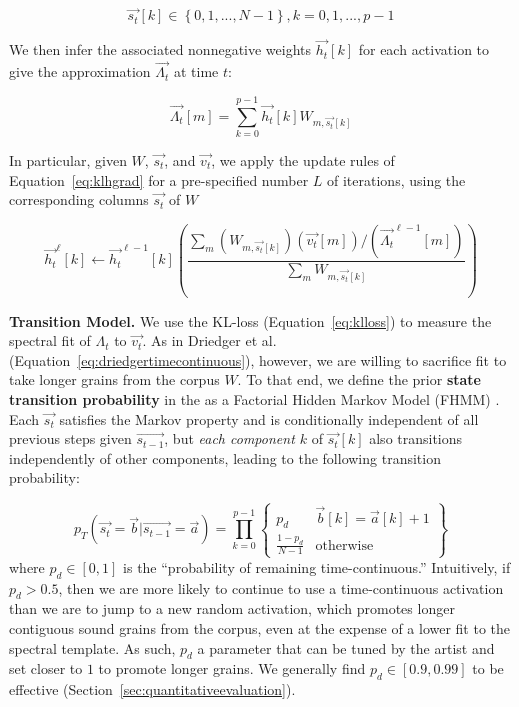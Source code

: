 \documentclass{article}
\begin{document}
    \begin{equation} 
        \label{eq:statevector}
        \vec{s_t}[k] \in \left\{0, 1, ..., N-1\right\}, k = 0, 1, ..., p-1 
    \end{equation}

    We then infer the associated nonnegative weights $\vec{h_t}[k]$ for each activation to give the approximation $\vec{\Lambda_t}$ at time $t$:
    
    \begin{equation}
        \label{eq:approximation}
        \vec{\Lambda_t}[m] = \sum_{k=0}^{p-1} \vec{h_t}[k]  W_{m, \vec{s_t}[k]}
    \end{equation}

    In particular, given $W$, $\vec{s_t}$, and $\vec{v_t}$, we apply the update rules of Equation~\ref{eq:klhgrad} for a pre-specified number $L$ of iterations, using the corresponding columns $\vec{s_t}$ of $W$

    \begin{equation}
        \label{eq:sparseklhgrad}
        \vec{h_t}^{\ell}[k]  \gets \vec{h_t}^{\ell-1}[k] \left(  \frac{\sum_m (W_{m, \vec{s_t}[k]}) (\vec{v_t}[m]) / (\vec{\Lambda_t}^{\ell-1}[m]) }{ \sum_{m} W_{m, \vec{s_t}[k]}} \right)
    \end{equation}
    

    \textbf{Transition Model.} We use the KL-loss (Equation~\ref{eq:klloss}) to measure the spectral fit of $\Lambda_t$ to $\vec{v_t}$.  As in Driedger et al. \cite{driedger2015let} (Equation~\ref{eq:driedgertimecontinuous}), however, we are willing to sacrifice fit to take longer grains from the corpus $W$.  To that end, we define the prior  \textbf{state transition probability} in the as a Factorial Hidden Markov Model (FHMM) \cite{ghahramani1995factorial}. Each $\vec{s_t}$ satisfies the Markov property and is conditionally independent of all previous steps given $\vec{s_{t-1}}$, but {\em each component $k$} of $\vec{s_t}[k]$ also transitions independently of other components, leading to the following transition probability:

    \begin{equation}
        \label{eq:transitionprob}
        p_T(\vec{s_t} = \vec{b} | \vec{s_{t-1}} = \vec{a}) = \prod_{k=0}^{p-1} \left\{  \begin{array}{cc}  p_d & \vec{b}[k] = \vec{a}[k]+1  \\ \frac{1-p_d}{N-1} & \text{otherwise} \end{array} \right\}
    \end{equation}
    where $p_d \in [0, 1]$ is the ``probability of remaining time-continuous.''  Intuitively, if $p_d > 0.5$, then we are more likely to continue to use a time-continuous activation than we are to jump to a new random activation, which promotes longer contiguous sound grains from the corpus, even at the expense of a lower fit to the spectral template.  As such, $p_d$ a parameter that can be tuned by the artist and set closer to $1$ to promote longer grains.  We generally find $p_d \in [0.9, 0.99]$ to be effective (Section~\ref{sec:quantitativeevaluation}).
\end{document}
